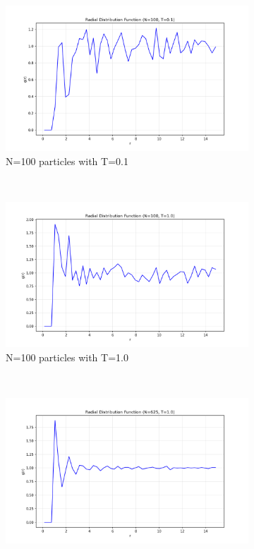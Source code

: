 \begin{figure}[H]
	\centering
	\begin{subfigure}{0.5\textwidth}
		\includegraphics[width=\textwidth]{media/rdf_N100_T0.1.png}
		\caption{N=100 particles with T=0.1}
		\label{sfig:nvt_rdf_N100_T01}
	\end{subfigure}%
	~
	\begin{subfigure}{0.5\textwidth}
		\includegraphics[width=\textwidth]{media/rdf_N100_T1.0.png}
		\caption{N=100 particles with T=1.0}
		\label{sfig:nvt_rdf_N100_T10}
	\end{subfigure}%
	\\
	\begin{subfigure}{0.5\textwidth}
		\includegraphics[width=\textwidth]{media/rdf_N625_T1.0.png}

\end{subfigure}
\end{figure}
